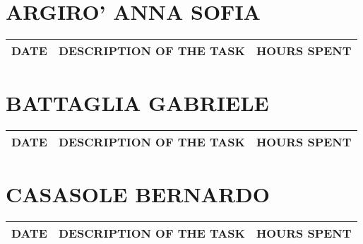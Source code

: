 \section{ARGIRO' ANNA SOFIA}
\begin{table}[h!]
\begin{tabular}{|c|p{3in}|c|}
\hline
\textbf{DATE} &\textbf{DESCRIPTION OF THE TASK} & \textbf{HOURS SPENT}\\
\hline
\end{tabular}
\end{table}

\clearpage


\section{BATTAGLIA GABRIELE}
\begin{table}[h!]
	\begin{tabular}{|c|p{3in}|c|}
		\hline
		\textbf{DATE} &\textbf{DESCRIPTION OF THE TASK} & \textbf{HOURS SPENT}\\
		\hline
		
	\end{tabular}
\end{table}

\clearpage

\section{CASASOLE BERNARDO}
\begin{table}[h!]
	\begin{tabular}{|c|p{3in}|c|}
		\hline
		\textbf{DATE} &\textbf{DESCRIPTION OF THE TASK} & \textbf{HOURS SPENT}\\
		\hline
		
	\end{tabular}
\end{table}